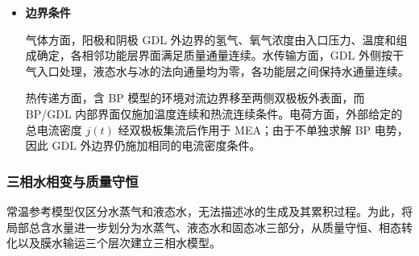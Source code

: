 \documentclass[bwprint]{gmcmthesis}
\numberwithin{figure}{section}
\begin{document}
\begin{itemize}
 含双极板模型中，该初始温度同时赋予 MEA 和两侧 BP。初始孔隙液态水及冰满足
\begin{equation}
m_l(x,0) = 0, \qquad m_i(x,0) = 0.
\tag{4-10}
\end{equation}

 PEM 初始膜含水量取附件给定的$\lambda_0 = 3$， 相应未冻束缚水质量浓度为$38.7 \times 3 = 116.1\,\text{kg}\,\text{m}^{-3}$。

 阳、阴极均采用干气入口，因此孔隙初始水蒸气取零；初始气体浓度根据 \(p = 101325\,\text{Pa}\)、入口气体组成及理想气体状态方程计算。

\item \textbf {边界条件}

气体方面，阳极和阴极 GDL 外边界的氢气、氧气浓度由入口压力、温度和组成确定，各相邻功能层界面满足质量通量连续。水传输方面，GDL 外侧按干气入口处理，液态水与冰的法向通量均为零，各功能层之间保持水通量连续。

热传递方面，含 BP 模型的环境对流边界移至两侧双极板外表面，而 BP/GDL 内部界面仅施加温度连续和热流连续条件。电荷方面，外部给定的总电流密度 \(j(t)\) 经双极板集流后作用于 MEA；由于不单独求解 BP 电势，因此 GDL 外边界仍施加相同的电流密度条件。


\end{itemize}


\subsubsection{三相水相变与质量守恒}
常温参考模型仅区分水蒸气和液态水，无法描述冰的生成及其累积过程。为此，将局部总含水量进一步划分为水蒸气、液态水和固态冰三部分，从质量守恒、相态转化以及膜水输运三个层次建立三相水模型。
\end{document}
